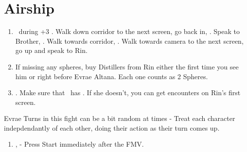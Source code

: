 \chapter{Airship}

\begin{enumerate}
	\item \sd\ during \cs+3 \skippablefmv. Walk down corridor to the next screen, go back in, \sd. Speak to Brother, \sd. Walk towards corridor, \sd. Walk towards camera to the next screen, go up and speak to Rin.
	\item If missing any spheres, buy Distillers from Rin either the first time you see him or right before Evrae Altana. Each one counts as 2 Spheres.
	\item \save. Make sure that \rikku\ has \od. If she doesn't, you can get encounters on Rin's first screen.
\end{enumerate}
\begin{battle}[32000]{Evrae}
	Turns in this fight can be a bit random at times - Treat each character indepdendantly of each other, doing their action as their turn comes up.
	\begin{itemize}
	\end{itemize}
\end{battle}
\begin{enumerate}[resume]
	\item \sd, \skippablefmv[3:00] - Press Start immediately after the FMV.
\end{enumerate}